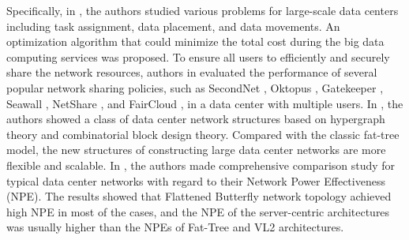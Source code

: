 \documentclass[twocolumn,10pt]{IEEEtran}
\begin{document}
Specifically, in \cite{LGu01}, the authors studied various problems for large-scale data centers including task assignment, data placement, and data movements. An optimization algorithm that could minimize the total cost during the big data computing services was proposed. To ensure all users to efficiently and securely share the network resources, authors in \cite{TWang01} evaluated the performance of several popular network sharing policies, such as SecondNet \cite{CGuo01}, Oktopus \cite{HBallani01}, Gatekeeper \cite{HRodrigues01}, Seawall \cite{AShieh01}, NetShare \cite{TLam01}, and FairCloud \cite{LPopa01}, in a data center with multiple users. In \cite{JZhang01}, the authors showed a class of data center network structures based on hypergraph theory and combinatorial block design theory. Compared with the classic fat-tree model, the new structures of constructing large data center networks are more flexible and scalable. In \cite{YShang01}, the authors made comprehensive comparison study for typical data center networks with regard to their Network Power Effectiveness (NPE). The results showed that Flattened Butterfly \cite{JKim01} network topology achieved high NPE in most of the cases, and the NPE of the server-centric architectures was usually higher than the NPEs of Fat-Tree \cite{CELeiserson01} and VL2 \cite{AGreenberg01} architectures.
\end{document}
